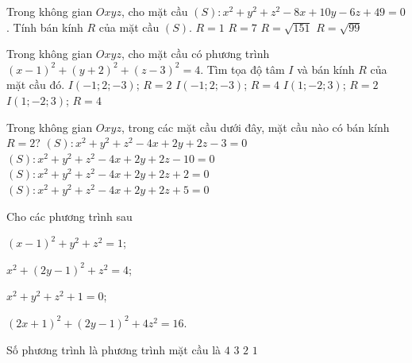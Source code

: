 \begin{ex}%
	Trong không gian $Oxyz$, cho mặt cầu $(S)\colon x^2+y^2+z^2-8x+10y-6z+49=0$. Tính bán kính $R$ của mặt cầu $(S)$.
	\choice
	{\True $R=1$}
	{$R=7$}
	{$R=\sqrt{151}$}
	{$R=\sqrt{99}$}
\end{ex}
		
\begin{ex}%
	Trong không gian $Oxyz$, cho mặt cầu có phương trình $(x-1)^2+(y+2)^2+(z-3)^2=4$. Tìm tọa độ tâm $I$ và bán kính $R$ của mặt cầu đó.
	\choice
	{$I(-1;2;-3)$; $R=2$}
	{$I(-1;2;-3)$; $R=4$}
	{\True $I(1;-2;3)$; $R=2$}
	{$I(1;-2;3)$; $R=4$}
\end{ex}		
		
\begin{ex}%
	Trong không gian $Oxyz$, trong các mặt cầu dưới đây, mặt cầu nào có bán kính $R=2$?
	\choice
	{$(S)\colon x^2+y^2+z^2-4x+2y+2z-3=0$}
	{$(S)\colon x^2+y^2+z^2-4x+2y+2z-10=0$}
	{\True $(S)\colon x^2+y^2+z^2-4x+2y+2z+2=0$}
	{$(S)\colon x^2+y^2+z^2-4x+2y+2z+5=0$}
\end{ex}
		
\begin{ex}%
	Cho các phương trình sau
	\begin{listEX}[2]
		\item $\left(x-1\right)^2+y^2+z^2=1$;
		\item $x^2+\left(2y-1\right)^2+z^2=4$;
		\item $x^2+y^2+z^2+1=0$;
		\item $\left(2x+1\right)^2+\left(2y-1\right)^2+4z^2=16$.
	\end{listEX}
	Số phương trình là phương trình mặt cầu là
	\choice
	{$4$}
	{$3$}
	{\True $2$}
	{$1$}
\end{ex}
		
